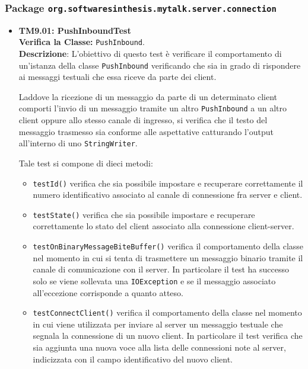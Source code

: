 \subsubsection{Package \texttt{org.softwaresinthesis.mytalk.server.connection}}
\begin{itemize}

\item \textbf{TM9.01: PushInboundTest}\\
\textbf{Verifica la Classe:} \texttt{PushInbound}.\\
\textbf{Descrizione}: L'obiettivo di questo test è verificare il comportamento di un'istanza della classe \texttt{PushInbound} verificando che sia in grado di rispondere ai messaggi testuali che essa riceve da parte dei client.

Laddove la ricezione di un messaggio da parte di un determinato client comporti l'invio di un messaggio tramite un altro \texttt{PushInbound} a un altro client oppure allo stesso canale di ingresso, si verifica che il testo del messaggio trasmesso sia conforme alle aspettative catturando l'output all'interno di uno \texttt{StringWriter}.
 
Tale test si compone di dieci metodi:
\begin{itemize}

\item \texttt{testId()} verifica che sia possibile impostare e recuperare correttamente il numero identificativo associato al canale di connessione fra server e client.

\item \texttt{testState()} verifica che sia possibile impostare e recuperare correttamente lo stato del client associato alla connessione client-server.

\item \texttt{testOnBinaryMessageBiteBuffer()} verifica il comportamento della classe nel momento in cui si tenta di trasmettere un messaggio binario tramite il canale di comunicazione con il server. In particolare il test ha successo solo se viene sollevata una \texttt{IOException} e se il messaggio associato all'eccezione corrisponde a quanto atteso.

\item \texttt{testConnectClient()} verifica il comportamento della classe nel momento in cui viene  utilizzata per inviare al server un messaggio testuale che segnala la connessione di un nuovo client. In particolare il test verifica che sia aggiunta una nuova voce alla lista delle connessioni note al server, indicizzata con il campo identificativo del nuovo client.


\end{itemize}
\end{itemize}
